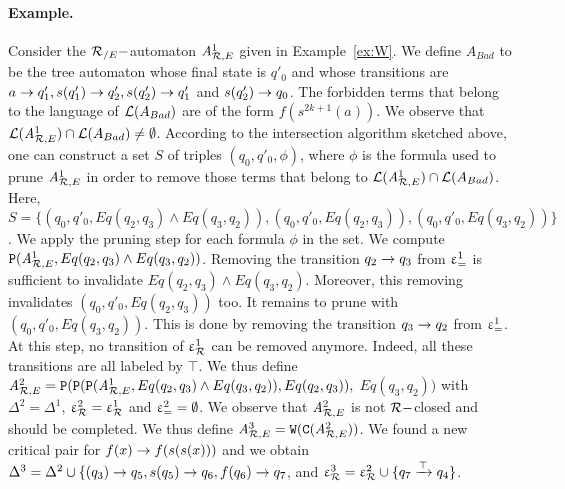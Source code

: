 \paragraph{Example.}
Consider the ${\mathcal R_{/E}}-$automaton ${\it A}_{\mathcal R,E}^1$ given in Example~\ref{ex:W}.
We define $A_{Bad}$ to be the tree automaton whose final state is
$q'_0$ and whose transitions are $a\rightarrow q'_1, s(q'_1)\rightarrow q'_2, s(q'_2)\rightarrow
q'_1$ and $s(q'_2)\rightarrow q_0$.  The forbidden terms that belong to the
language of $\mathcal{L}(A_{Bad})$ are of the form $f(s^{2k + 1}(a))$.
We observe that $\mathcal{L}({\it A}_{\mathcal R,E}^1) \cap \mathcal{L}(A_{Bad}) \not=
\emptyset$.  According to the intersection algorithm sketched above,
one can construct a set $S$ of triples $(q_0,q'_0,\phi)$, where $\phi$
is the formula used to prune ${\it A}_{\mathcal R,E}^1$ in order to remove those
terms that belong to $\mathcal{L}({\it A}_{\mathcal R,E}^1) \cap \mathcal{L}(A_{Bad})$.  Here,
$S=\{(q_0,q'_0,Eq(q_2,q_3)\land Eq(q_3,q_2)), (q_0,q'_0,Eq(q_2,q_3)),(q_0,q'_0,Eq(q_3,q_2))\}$.  We apply the pruning step for each
formula $\phi$ in the set.  We compute $\mathtt{P}({\it A}_{\mathcal R,E}^1,
Eq(q_2,q_3)\land Eq(q_3,q_2))$.  Removing the transition $q_2 \rightarrow q_3$
from $\upvarepsilon_{=}^1$ is sufficient to invalidate $Eq(q_2,q_3)\land
Eq(q_3,q_2)$. Moreover, this removing invalidates
$(q_0,q'_0,Eq(q_2,q_3))$ too. It remains to prune with
$(q_0,q'_0,Eq(q_3,q_2))$. This is done by removing the transition
$q_3\rightarrow q_2$ from $\upvarepsilon_{=}^1$.  At this step, no transition of $\upvarepsilon_{\mathcal R}^1$
can be removed anymore. Indeed, all these transitions are all labeled
by $\top$. We thus define
${\it A}_{\mathcal R,E}^2=\mathtt{P}(\mathtt{P}(\mathtt{P}({\it A}_{\mathcal R,E}^1,Eq(q_2,q_3)\land
Eq(q_3,q_2)),Eq(q_2,q_3)),$ $Eq(q_3,q_2))$ with $\Delta^2=\Delta^1$,
$\upvarepsilon_{\mathcal R}^2= \upvarepsilon_{\mathcal R}^1$ and $\upvarepsilon_{=}^2=\emptyset$. We observe that ${\it A}_{\mathcal R,E}^2$
is not $\mathcal R-$closed and should be completed. We thus define
${\it A}_{\mathcal R,E}^3=\mathtt{W}(\mathtt{C}({\it A}_{\mathcal R,E}^2))$. We found a new critical pair
for $f(x) \rightarrow f(s(s(x)))$ and we obtain $\Delta^3 = \Delta^2 \cup
\{(q_3)\rightarrow q_5, s(q_5)\rightarrow q_6, f(q_6) \rightarrow q_7$, and $\upvarepsilon_{\mathcal R}^3 = \upvarepsilon_{\mathcal R}^2 \cup
\{q_7\xrightarrow{\top}q_4\}$.

